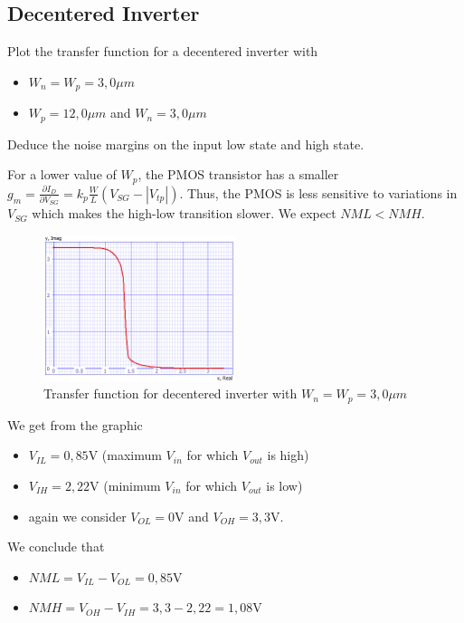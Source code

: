 \documentclass[../main.tex]{subfiles}
\begin{document}
	\subsection{Decentered Inverter}
	{
		\begin{tcolorbox}[colback=gray!5!white,colframe=gray!75!black]
			Plot the transfer function for a decentered inverter with
			\begin{itemize}
				\item $W_n = W_p = 3,0\mu m$
				\item $W_p = 12,0\mu m$ and $W_n = 3,0\mu m$
			\end{itemize}
			Deduce the noise margins on the input low state and high state.
		\end{tcolorbox}
		
		For a lower value of $W_p$, the PMOS transistor has a smaller $g_m = \frac{\partial I_D}{\partial V_{SG}} = k_p \frac{W}{L}(V_{SG} - |V_{tp}|)$. Thus, the PMOS is less sensitive to variations in $V_{SG}$ which makes the high-low transition slower. We expect $NML < NMH$.
		
		\begin{figure}[H]
			\centering
			\includegraphics[width=0.5\textwidth]{plots/Q4_1.png}
			\caption{Transfer function for decentered inverter with $W_n = W_p = 3,0\mu m$}
		\end{figure}
		
		We get from the graphic
		
		\begin{itemize}
			\item $V_{IL} = 0,85$V (maximum $V_{in}$ for which $V_{out}$ is high)
			\item $V_{IH} = 2,22$V (minimum $V_{in}$ for which $V_{out}$ is low)
			\item again we consider $V_{OL} = 0$V and $V_{OH} = 3,3$V.
		\end{itemize}
		
		We conclude that
		\begin{itemize}
			\item $NML = V_{IL} - V_{OL} = 0,85$V
			\item $NMH = V_{OH} - V_{IH} = 3,3 - 2,22 = 1,08$V
		\end{itemize}
		
}
\end{document}
